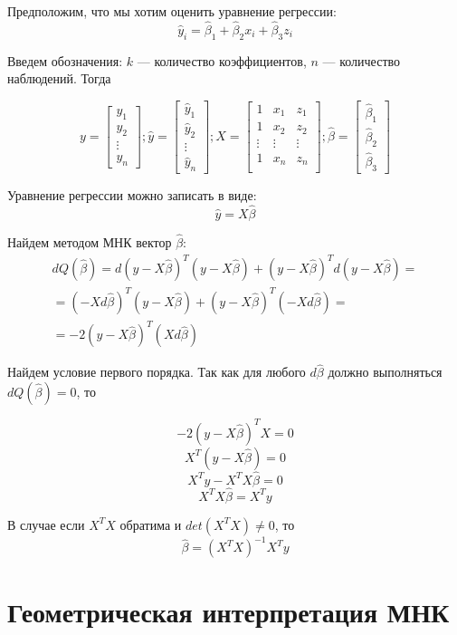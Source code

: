 \documentclass[12pt]{article} %
\theoremstyle{definition} %
\def \hb{\hat{\beta}}
\def \hy{\hat{y}}
\begin{document}
Предположим, что мы хотим оценить уравнение регрессии:
\[
\hy_i = \hb_1 + \hb_2 x_i + \hb_3 z_i
\]

Введем обозначения: $k$ — количество коэффициентов, $n$ — количество наблюдений. Тогда

\[
y = \begin{bmatrix}
           y_{1} \\
           y_{2} \\
           \vdots \\
           y_{n}
         \end{bmatrix};
\hy = \begin{bmatrix}
           \hy_{1} \\
           \hy_{2} \\
           \vdots \\
           \hy_{n}
         \end{bmatrix};
X =  \begin{bmatrix}
           1 & x_1 & z_1 \\
           1 & x_2 & z_2 \\
           \vdots & \vdots & \vdots \\
           1 & x_n &  z_n \\
         \end{bmatrix};
\hb = \begin{bmatrix}
           \hb_{1} \\
           \hb_{2} \\
           \hb_{3}
         \end{bmatrix}
\]

Уравнение регрессии можно записать в виде:
\[
\hy = X\hb
\]

Найдем методом МНК вектор $\hb$:
\begin{eqnarray*}
dQ(\hb) = d( y-X\hb)^T( y-X\hb) + ( y-X\hb)^Td( y-X\hb) = \\
=(-Xd\hb)^T( y-X\hb) + (y-X\hb)^T(-Xd\hb)=\\
=-2(y-X\hb)^T(Xd\hb)
\end{eqnarray*}

Найдем условие первого порядка. Так как для любого $d\hb$ должно выполняться $dQ(\hb)=0$, то

\[
-2(y-X\hb)^TX = 0
\]
\[
X^T(y-X\hb) = 0
\]
\[
X^Ty-X^TX\hb = 0
\]
\[
X^TX\hb = X^Ty
\]

В случае если $X^TX$ обратима и $det(X^TX) \neq 0$, то
\[
\hb = (X^TX)^{-1}X^Ty
\]

\section{Геометрическая интерпретация МНК}
\end{document}
